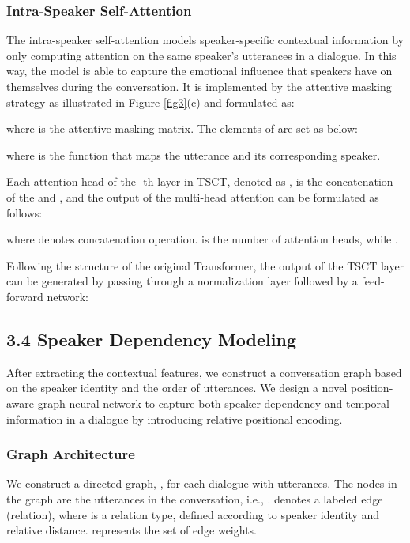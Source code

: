 \documentclass[letterpaper]{article} \usepackage{aaai22}  \usepackage{times}  \usepackage{helvet}  \usepackage{courier}  \usepackage[hyphens]{url}  \usepackage{graphicx} \urlstyle{rm} \def\UrlFont{\rm}  \usepackage{natbib}  \usepackage{caption} \DeclareCaptionStyle{ruled}{labelfont=normalfont,labelsep=colon,strut=off} \frenchspacing  \setlength{\pdfpagewidth}{8.5in}  \setlength{\pdfpageheight}{11in}  \usepackage{algorithm}
\begin{document}
\subsubsection{Intra-Speaker Self-Attention} The intra-speaker self-attention models speaker-specific contextual information by only computing attention on the same speaker's utterances in a dialogue. In this way, the model is able to capture the emotional  influence  that  speakers  have  on  themselves during the conversation. It is implemented by the attentive masking strategy as illustrated in Figure \ref{fig3}(c) and formulated as:



where  is the attentive masking matrix. The elements of  are set as below: 



where  is the function that maps the utterance and its corresponding speaker.

Each attention head  of the -th layer in TSCT, denoted as , is the concatenation of the  and , and the output of the multi-head attention can be formulated as follows: 


where  denotes concatenation operation.  is the number of attention heads, while .




Following the structure of the original Transformer, the output of the TSCT layer can be generated by passing  through a normalization layer followed by a feed-forward network:



\subsection{3.4 Speaker Dependency Modeling}

After extracting the contextual features, we construct a conversation graph based on the speaker identity and the order of utterances. We design a novel position-aware graph neural network to capture both speaker dependency and temporal information in a dialogue by introducing relative positional encoding. 


\subsubsection{Graph Architecture}
We construct a directed graph, , for each dialogue with  utterances. The nodes in the graph are the utterances in the conversation, i.e., .  denotes a labeled edge (relation), where  is a relation type, defined according to speaker identity and relative distance.  represents the set of edge weights.
\end{document}
